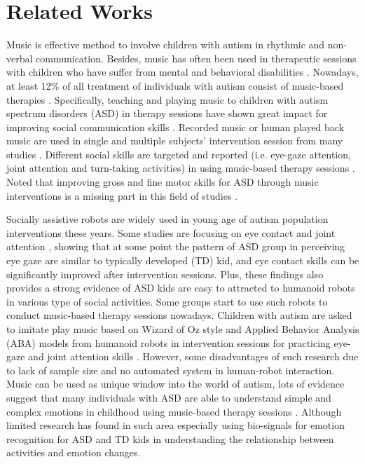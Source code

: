 \documentclass[conference]{IEEEtran}
\begin{document}
\section{Related Works}
Music is effective method to involve children with autism in rhythmic and non-verbal
communication. Besides, music has often been used in therapeutic sessions with children who have suffer from mental and behavioral
disabilities \cite{roper2003melodic, boso2007effect}. Nowadays, at least 12\% of all treatment of individuals with autism consist
of music-based therapies \cite{bhat2013review}. Specifically, teaching and playing music to children
with autism spectrum disorders (ASD) in therapy sessions have shown great impact for improving social communication
skills \cite{lim2011effects}. Recorded music or human played back music are used in single and multiple subjects'
intervention session from many studies \cite{bhat2013review, corbett2008brief}. Different social skills are targeted and reported
(i.e. eye-gaze attention, joint attention and turn-taking activities) in using music-based therapy sessions 
\cite{stephens2008spontaneous, kim2008effects}. Noted that improving gross and fine motor skills for ASD
through music interventions is a missing part in this field of studies \cite{bhat2013review}.

Socially assistive robots are widely used in young age of autism population interventions these years. Some studies are
focusing on eye contact and joint attention \cite{feng2013can, mihalache2020perceiving, mavadati2014comparing}, 
showing that at some point the pattern of ASD group in perceiving eye gaze are similar to typically 
developed (TD) kid, and eye contact skills can be significantly improved after intervention sessions. Plus,
these findings also provides a strong evidence of ASD kids are easy to attracted to humanoid robots in
various type of social activities. Some groups start to use such robots to conduct music-based therapy
sessions nowadays. Children with autism are asked to imitate play music based on Wizard of Oz style
and Applied Behavior Analysis (ABA) models from humanoid robots in intervention sessions for practicing
eye-gaze and joint attention skills \cite{peng2014using, taheri2015impact, taheri2016social}. However, 
some disadvantages of such research due to lack of sample size and no automated system in human-robot 
interaction. Music can be used as unique window into the world of autism, lots of evidence suggest that
many individuals with ASD are able to understand simple and complex emotions in childhood using music-based
therapy sessions \cite{molnar2012music}. Although limited research has found in such area especially using
bio-signals for emotion recognition for ASD and TD kids \cite{feng2018wavelet} in understanding the 
relationship between activities and emotion changes. 
\end{document}
